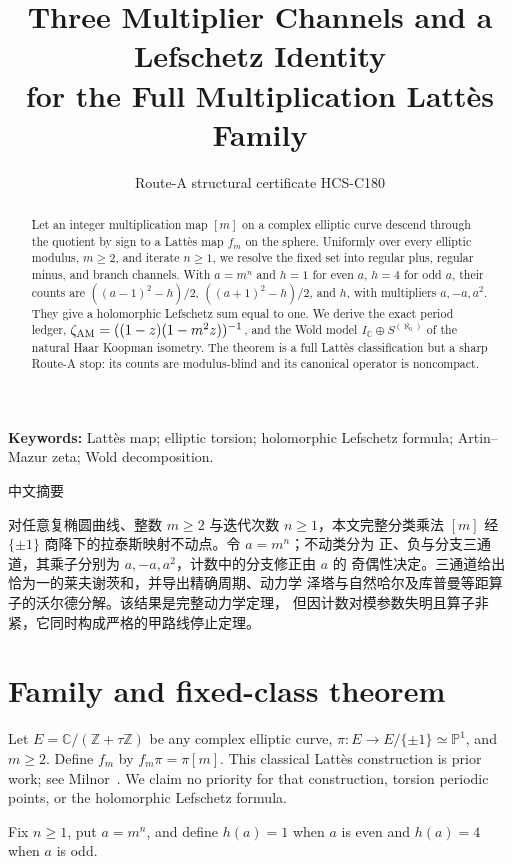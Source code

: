 \documentclass[10pt]{article}
\title{\vspace{-1.5em}Three Multiplier Channels and a Lefschetz Identity\\for the Full Multiplication Latt\`es Family}
\author{Route-A structural certificate HCS-C180}
\date{}
\begin{document}
\maketitle
\begin{abstract}
Let an integer multiplication map $[m]$ on a complex elliptic curve descend
through the quotient by sign to a Latt\`es map $f_m$ on the sphere.  Uniformly
over every elliptic modulus, $m\ge2$, and iterate $n\ge1$, we resolve the fixed
set into regular plus, regular minus, and branch channels.  With $a=m^n$ and
$h=1$ for even $a$, $h=4$ for odd $a$, their counts are
$((a-1)^2-h)/2$, $((a+1)^2-h)/2$, and $h$, with multipliers $a,-a,a^2$.
They give a holomorphic Lefschetz sum equal to one.  We derive the exact
period ledger, $\zeta_{\rm AM}=((1-z)(1-m^2z))^{-1}$, and the Wold model
$I_{\mathbb C}\oplus S^{(\aleph_0)}$ of the natural Haar Koopman isometry.
The theorem is a full Latt\`es classification but a sharp Route-A stop: its
counts are modulus-blind and its canonical operator is noncompact.
\end{abstract}
\noindent\textbf{Keywords:} Latt\`es map; elliptic torsion; holomorphic
Lefschetz formula; Artin--Mazur zeta; Wold decomposition.

\begin{otherlanguage}{chinese-simplified}
\begin{center}{\large 中文摘要}\end{center}
对任意复椭圆曲线、整数 $m\ge2$ 与迭代次数 $n\ge1$，本文完整分类乘法
$[m]$ 经 $\{\pm1\}$ 商降下的拉泰斯映射不动点。令 $a=m^n$；不动类分为
正、负与分支三通道，其乘子分别为 $a,-a,a^2$，计数中的分支修正由 $a$ 的
奇偶性决定。三通道给出恰为一的莱夫谢茨和，并导出精确周期、动力学
泽塔与自然哈尔及库普曼等距算子的沃尔德分解。该结果是完整动力学定理，
但因计数对模参数失明且算子非紧，它同时构成严格的甲路线停止定理。
\end{otherlanguage}

\section{Family and fixed-class theorem}
Let $E=\mathbb C/(\mathbb Z+\tau\mathbb Z)$ be any complex elliptic curve,
$\pi:E\to E/\{\pm1\}\simeq\mathbb P^1$, and $m\ge2$.  Define $f_m$ by
$f_m\pi=\pi[m]$.  This classical Latt\`es construction is prior work; see
Milnor~\cite{milnor}.  We claim no priority for that construction, torsion
periodic points, or the holomorphic Lefschetz formula.

Fix $n\ge1$, put $a=m^n$, and define $h(a)=1$ when $a$ is even and $h(a)=4$
when $a$ is odd.
\end{document}
